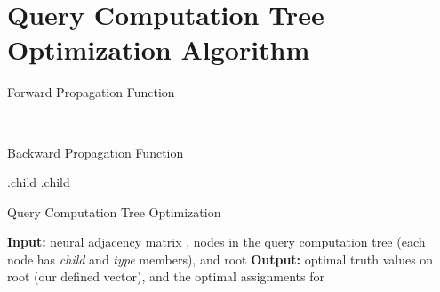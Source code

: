 \section{Query Computation Tree Optimization Algorithm}
\label{app:qto}

\begin{minipage}[!h]{\textwidth}
\begin{minipage}{.48\textwidth}
\centering
\begin{algorithm}[H]
\small
\caption{Forward Propagation Function}
\label{alg:forward}
\begin{algorithmic}
   \State 
   \State  {}
   \State 
   \EndFor
   \EndIf
   \State  {}
   \State 
   \EndFor
   \State 
   \EndIf
   \State 
   \Else
   \State  {}
   \State 
   \EndIf
   \EndIf
   \State 
   \Else
   \State  {}
   \State 
   \EndIf
   \EndIf
   \State  \\
   \Return 
   \EndFunction
\end{algorithmic}
\end{algorithm}
\vfill
\end{minipage}
\hfill
\begin{minipage}{.48\textwidth}
\centering
\begin{algorithm}[H]
\small
\caption{Backward Propagation Function}
\label{alg:backward}
\begin{algorithmic}
   \State 
   \State {}
   \EndFor
   \EndIf
   \State .child
   \State 
   \State {}
   \EndIf
   \EndIf
   \State .child
   \State 
   \State {}
   \EndIf
   \EndIf
   \Return 
   \EndFunction
\end{algorithmic}
\end{algorithm}
\begin{algorithm}[H]
\small
\caption{Query Computation Tree Optimization}
\label{alg:qto}
\begin{algorithmic}
   \State \textbf{Input:} neural adjacency matrix , nodes in the query computation tree (each node has \emph{child} and \emph{type} members), and root 
   \State \textbf{Output: } optimal truth values  on root (our defined  vector), and the optimal assignments  for 
   \State 
   \State {}
   \State {} \\
   \Return 
\end{algorithmic}
\end{algorithm}
\vfill
\end{minipage}
\end{minipage}

